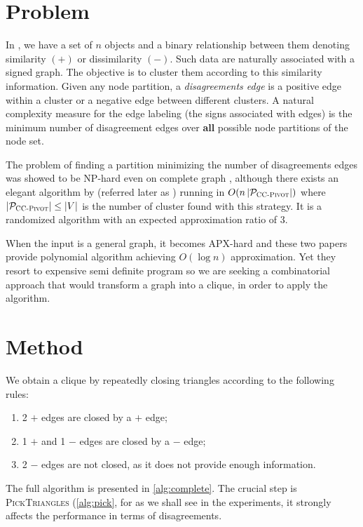 \section{Problem}

In \pcc{}, we have a set of $n$ objects and a binary relationship between them
denoting similarity $(+)$  or dissimilarity $(-)$. Such data are naturally
associated with a signed graph. The objective is to cluster them according to
this similarity information.
Given any node partition, a \emph{disagreements edge} is a positive edge within a
cluster or a negative edge between different clusters. A natural complexity
measure for the edge labeling (the signs associated with edges) is the minimum
number of disagreement edges over \textbf{all} possible node partitions of the node
set.

The problem of finding a partition minimizing the number of disagreements
edges was showed to be NP-hard even on complete graph \autocite{Bansal2002},
although there exists an elegant algorithm by \textcite{Ailon2008} (referred
later as \ccp{}) running in $O(n\left|\mathcal{P}_{\text{\textsc{CC-Pivot}{}}}\right|)$
where $\left|\mathcal{P}_{\text{\textsc{CC-Pivot}{}}}\right| \le |V|$ is the number of
cluster found with this strategy. It is a randomized algorithm with an
expected approximation ratio of $3$.

When the input is a general graph, it becomes APX-hard
\autocites{Charikar2003}{Demaine2006} and these two papers provide polynomial
algorithm achieving $O(\log n)$ approximation. Yet they resort to expensive
semi definite program so we are seeking a combinatorial approach that would
transform a graph into a clique, in order to apply the \ccp{} algorithm.

\section{Method}

We obtain a clique by repeatedly closing triangles according to the following
rules:
\begin{enumerate}[i]
	\item 2 $+$ edges are closed by a $+$ edge;
	\item 1 $+$ and 1 $-$ edges are closed by a $-$ edge;
	\item 2 $-$ edges are not closed, as it does not provide enough
		information.
\end{enumerate}

The full algorithm is presented in \autoref{alg:complete}. The crucial step is
\textsc{PickTriangles} (\autoref{alg:pick}, for as we shall see in the
experiments, it strongly affects the performance in terms of disagreements.

